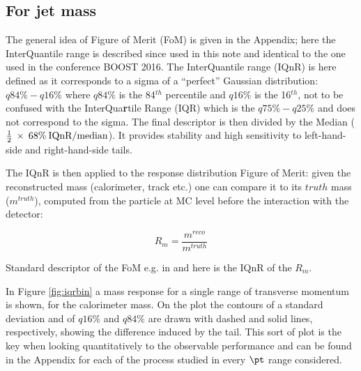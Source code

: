 


\subsection{For jet mass}
The general idea of Figure of Merit (FoM) is given in the Appendix; here the InterQuantile range is described since used in this note and identical to the one used in the conference BOOST 2016.
The InterQuantile range (IQnR) is here defined as it corresponds to a sigma of a ``perfect'' Gaussian distribution: $q84\%-q16\%$ where $q84\%$ is the 84$^{th}$ percentile and $q16\%$ is the 16$^{th}$, not to be confused with the InterQua\textbf{r}tile Range (IQR) which is the $q75\%-q25\%$ and does not correspond to the sigma. The final descriptor is then divided by the Median ($\frac{1}{2}\: \times\: 68\% \:\textrm{IQnR/median}$). It provides stability and high sensitivity to left-hand-side and right-hand-side tails.

The IQnR is then applied to the response distribution Figure of Merit: given the reconstructed mass (calorimeter, track etc.) one can compare it to its $truth$ mass ($m^{truth}$), computed from the particle at MC level before the interaction with the detector:

$$R_m=\frac{m^{reco}}{m^{truth}}$$

Standard descriptor of the FoM e.g. in \cite{art35} and here is the IQnR of the $R_m$.
  
  
In Figure \ref{fig:iqrbin} a mass response for a single range of transverse momentum is shown, for the calorimeter mass. On the plot the contours of a standard deviation and of $q16\%$ and $q84\%$ are drawn with dashed and solid lines, respectively, showing the difference induced by the tail. This sort of plot is the key when looking quantitatively to the observable performance and can be found in the Appendix for each of the process studied in every $\pt$ range considered. 

